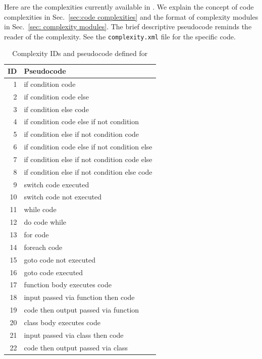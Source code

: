 \begin{appendices}
\newpage

Here are the complexities currently available in \CSharp.
We explain the concept of code complexities in Sec.~\ref{sec:code complexities} and
the format of complexity modules in Sec.~\ref{sec: complexity modules}.
The brief descriptive pseudocode reminds the reader of the complexity.
See the \verb|complexity.xml| file for the specific code.

\begin{table}[H]
\centering
\caption{Complexity IDs and pseudocode defined for \CSharp}
\begin{tabular}{|r|l|}
\hline
\textbf{ID} & \textbf{Pseudocode} \\
\hline
 1 & if condition code \\
\hline
 2 & if condition code else \\
\hline
 3 & if condition else code \\
\hline
 4 & if condition code else if not condition \\
\hline
 5 & if condition else if not condition code \\
\hline
 6 & if condition code else if not condition else \\
\hline
 7 & if condition else if not condition code else \\
 \hline
 8 & if condition else if not condition else code \\
\hline
 9 & switch code executed \\
\hline
10 & switch code not executed \\
\hline
11 & while code \\
\hline

12 & do code while \\
\hline
13 & for code \\
\hline
14 & foreach code \\
\hline
15 & goto code not executed \\
\hline
16 & goto code executed \\
\hline
17 & function body executes code \\
\hline
18 & input passed via function then code \\
\hline
19 & code then output passed via function \\
\hline
20 & class body executes code \\
\hline
21 & input passed via class then code \\
\hline
22 & code then output passed via class \\
\hline
\end{tabular}
\label{tab:complexity IDs for CSharp}
\end{table}


\end{appendices}
